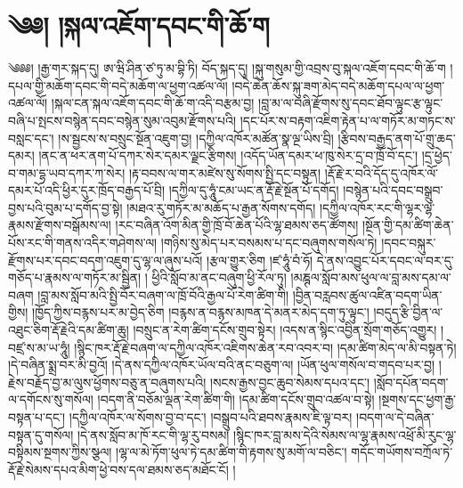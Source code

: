 \setcounter{footnote}{0} 
\chapter{༄༅། །སྐལ་འཇོག་དབང་གི་ཆོ་ག}༄༅༅། །རྒྱ་གར་སྐད་དུ། ཨ་ཝི་ཤིན་ཙ་ཏུ་མ་བྷི་ཏི། བོད་སྐད་དུ། །སྐུ་གསུམ་གྱི་འབྲས་བུ་སྐལ་འཇོག་དབང་གི་ཆོ་ག །དཔལ་གྱི་མཆོག་དབང་གི་བདེ་མཆོག་ལ་ཕྱག་འཚལ་ལོ། །བདེ་ཆེན་ཆོས་སྐུ་ཟག་མེད་བདེ་མཆོག་དཔལ་ལ་ཕྱག་འཚལ་ལོ། །སྐལ་ངན་སྐལ་འཇོག་དབང་གི་ཆོ་ག་འདི་བརྩམ་བྱ། །བླ་མ་ལ་བཞི་རྫོགས་སུ་དབང་ཐོབ་ལྟུང་རྩ་ལྟུང་བཞི་པ་སྤངས་བསྙེན་དབང་བསྙེན་སུམ་འབུམ་རྫོགས་པའི། །དང་པོར་ས་བརྟག་འཇིག་རྟེན་པ་ལ་གཏོར་མ་གཏང་ས་བསླང་དང་། །ས་སྦྱངས་ས་བསྲུང་སྔོན་འཇུག་བྱ། །དཀྱིལ་འཁོར་མཚོན་སྣ་ལྔ་ཡིས་བྲི། །རྩིབས་བརྒྱད་ནག་པོ་གྲུ་ཆད་དམར། །ནང་ན་ཕར་ནག་པོ་དཀར་སེར་དམར་ལྗང་རྩིགས། །འདོད་ཡོན་དམར་ཕ་ཁུ་སེར་དྲ་བ་ཁྲོ་བོ་དང་། །དྲ་ཕྱེད་བ་གམ་དྷ་ཡབ་དཀར་ཀ་སེར། །རྟ་བབས་ལ་གར་མཛེས་སུ་སོགས་སྤྱི་དང་བསྟུན། །རྡོ་རྗེ་ར་བའི་དོད་དུ་འཁོར་ལོ་དམར་པོ་འདི་ཕྱིར་དུར་ཁྲོད་བརྒྱད་པོ་བྲི། །དཀྱིལ་དུ་ཧཱུཾ་ངམ་ཡང་ན་རྡོ་རྗེ་སྔོན་པོ་དགོད། །བསྙེན་པའི་དབང་བསྒྲུབ་བྱས་པའི་བུམ་པ་དགོད་བྱ་སྟེ། །མཐའ་རུ་གཏོར་མ་མཆོད་པ་རྒྱན་སོགས་དགོད། །དཀྱིལ་འཁོར་རང་གི་ལྷར་ལྷ་རྣམས་རྫོགས་བསྒོམས་ལ། །རང་བཞིན་འོག་མིན་གྱི་ཁྲོ་བོ་ཆེན་པོའི་ལྷ་ཐམས་ཅད་ཚོགས། །སྔོན་གྱི་དམ་ཚིག་ཆེན་པོས་རང་གི་གནས་འདིར་གཤེགས་ལ། །གཉིས་སུ་མེད་པར་བསམས་པ་དང་བཞུགས་གསོལ་ཏེ། །དབང་བསྐུར་རྫོགས་པར་དབང་བདག་འཇུག་དུ་ལྷ་ལ་ཞུས་པའོ། །རྩལ་གྱུར་ཅིག །ཛ་ཧཱུཾ་བཾ་ཧོ། དེ་ནས་འབྱུང་པོར་དབང་ལ་བར་དུ་གཅོད་པ་རྣམས་ལ་གཏོར་མ་སྦྱིན། ། ཕྱིའི་སློབ་མ་ནང་བཞུག་ཕྱི་རོལ་ཏུ། །མཎྚལ་སློབ་མས་ཕུལ་ལ་བླ་མས་དམ་ལ་བཞག །བླ་མས་སློབ་མའི་སྤྱི་བོར་བཞག་ལ་ཁྲོ་བོའི་རྒྱལ་པོ་རེག་ཚིག་གི། །བྱིན་བརླབས་ཚུལ་འཛིན་བདག་ཡིན་གྱིས། །ཁྱོད་ཀྱིས་བརྙས་པར་མ་བྱེད་ཅིག །བརྙས་ན་བརྙས་མཁན་དེ་མནར་མེད་དག་ཏུ་ལྟུང་། །བདུད་རྩི་བྱིན་ལ་འཐུང་ཅིག་རྡོ་རྗེའི་དམ་ཚིག་ཆུ། །བསྲུང་ན་རེག་ཚིག་དངོས་གྲུབ་སྟེར། །འདས་ན་སྙིང་འབྱིན་སྲོག་གཅོད་འགྱུར། །བཛྲ་ས་མ་ཡ་ཧཱུཾ། །སྙིང་ཁར་རྡོ་རྗེ་བཞག་ལ་དཀྱིལ་འཁོར་འཇིགས་ཆེན་རབ་འབར་བ། །དམ་ཚིག་མེད་ལ་མི་བསྟན་ཏེ། །དེ་བཞིན་སྨྲ་བར་མི་བྱའོ། །དེ་ནས་དཀྱིལ་འཁོར་ཡོལ་བའི་ནང་བཅུག་ལ། །ཡོན་ཕུལ་གསོལ་བ་གདབ་པར་བྱ། །རྗེས་བརྗོད་བྱ་མ་ལུས་ཕྱོགས་བཅུ་ན་བཞུགས་པའི། །སངས་རྒྱས་བྱང་ཆུབ་སེམས་དཔའ་དང་། །སློབ་དཔོན་བདག་ལ་དགོངས་སུ་གསོལ། །བདག་ནི་བཅོམ་ལྡན་རེག་ཚིག་གི། །དམ་ཚིག་དངོས་གྲུབ་འཚལ་བ་སྟེ། །སྔགས་དང་ཕྱག་རྒྱ་བསྟན་པ་དང་། །དཀྱིལ་འཁོར་ལ་སོགས་བྱ་བ་དང་། །བསྒྲུབ་པའི་ཐབས་རྣམས་ཇི་ལྟ་བར། །བདག་ལ་དེ་བཞིན་བསྟན་དུ་གསོལ། །དེ་ནས་སློབ་མ་ཁོ་རང་གི་ལྷ་རུ་བསམ། །སྙིང་ཁར་བླ་མས་དེའི་སེམས་ལ་ལྷ་རྣམས་འཕྲོ་མི་རུང་ལྷ་བསྟིམས་སྔགས་ཀྱིས་སྩལ། །ལྷ་ལ་མེ་ཏོག་ཕུལ་ཏེ་དམ་ཚིག་གི་རྟགས་སུ་མགོ་ལ་བཅིང་། གདོང་གཡོགས་བཀྲོལ་ཏེ་རྡོ་རྗེ་སེམས་དཔའ་མིག་ཕྱེ་བས་དལ་ཐམས་ཅད་མཐོང་ངོ། །
